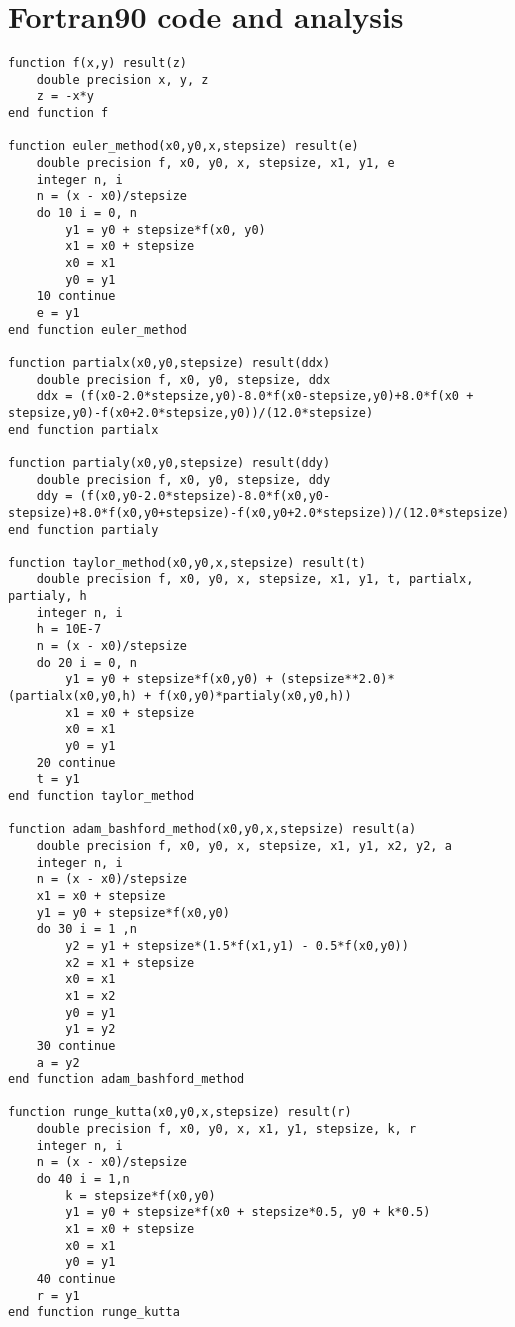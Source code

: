 \documentclass[a4paper,10pt]{article}
\begin{document}
\section*{Fortran90 code and analysis}
\begin{lstlisting}[language={[77]Fortran}]
function f(x,y) result(z)
    double precision x, y, z
    z = -x*y
end function f

function euler_method(x0,y0,x,stepsize) result(e)
    double precision f, x0, y0, x, stepsize, x1, y1, e
    integer n, i
    n = (x - x0)/stepsize
    do 10 i = 0, n
        y1 = y0 + stepsize*f(x0, y0)
        x1 = x0 + stepsize
        x0 = x1
        y0 = y1
    10 continue
    e = y1
end function euler_method

function partialx(x0,y0,stepsize) result(ddx)
    double precision f, x0, y0, stepsize, ddx
    ddx = (f(x0-2.0*stepsize,y0)-8.0*f(x0-stepsize,y0)+8.0*f(x0 + stepsize,y0)-f(x0+2.0*stepsize,y0))/(12.0*stepsize)
end function partialx

function partialy(x0,y0,stepsize) result(ddy)
    double precision f, x0, y0, stepsize, ddy
    ddy = (f(x0,y0-2.0*stepsize)-8.0*f(x0,y0-stepsize)+8.0*f(x0,y0+stepsize)-f(x0,y0+2.0*stepsize))/(12.0*stepsize)
end function partialy

function taylor_method(x0,y0,x,stepsize) result(t)
    double precision f, x0, y0, x, stepsize, x1, y1, t, partialx, partialy, h
    integer n, i
    h = 10E-7
    n = (x - x0)/stepsize
    do 20 i = 0, n
        y1 = y0 + stepsize*f(x0,y0) + (stepsize**2.0)*(partialx(x0,y0,h) + f(x0,y0)*partialy(x0,y0,h))
        x1 = x0 + stepsize
        x0 = x1
        y0 = y1
    20 continue
    t = y1
end function taylor_method

function adam_bashford_method(x0,y0,x,stepsize) result(a)
    double precision f, x0, y0, x, stepsize, x1, y1, x2, y2, a
    integer n, i
    n = (x - x0)/stepsize
    x1 = x0 + stepsize
    y1 = y0 + stepsize*f(x0,y0)
    do 30 i = 1 ,n
        y2 = y1 + stepsize*(1.5*f(x1,y1) - 0.5*f(x0,y0))
        x2 = x1 + stepsize
        x0 = x1
        x1 = x2
        y0 = y1
        y1 = y2
    30 continue
    a = y2
end function adam_bashford_method

function runge_kutta(x0,y0,x,stepsize) result(r)
    double precision f, x0, y0, x, x1, y1, stepsize, k, r
    integer n, i
    n = (x - x0)/stepsize
    do 40 i = 1,n
        k = stepsize*f(x0,y0)
        y1 = y0 + stepsize*f(x0 + stepsize*0.5, y0 + k*0.5)
        x1 = x0 + stepsize
        x0 = x1
        y0 = y1
    40 continue
    r = y1
end function runge_kutta


\end{lstlisting}
\end{document}
